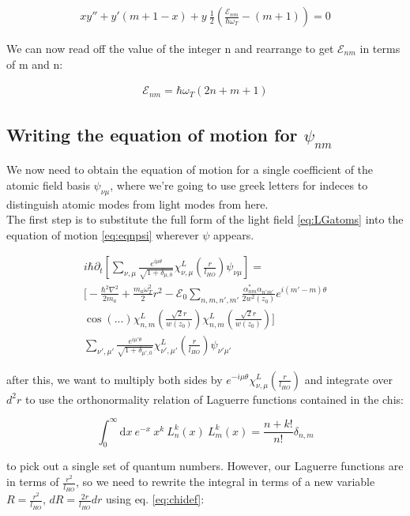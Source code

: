 \documentclass[a4paper,twocolumn,nobalancelastpage]{revtex4-1}
\newcommand{\lho}{l_{HO}}
\newcommand{\wzsq}{w^2(z_0)}
\newcommand{\af}{\psi_{\nu\mu}}
\newcommand{\lf}{\alpha_{nm}}
\newcommand{\lfp}{\alpha_{n'm'}}
\newcommand{\chiaf}{\chi_{\nu,\mu}^L\left(\frac{r}{\lho}\right)}
\newcommand{\chiafp}{\chi_{\nu',\mu'}^L\left(\frac{r}{\lho}\right)}
\newcommand{\chilf}{\chi_{n,m}^L\left(\frac{\sqrt{2}r}{w(z_0)}\right)}
\newcommand{\chilfp}{\chi_{n,m}^L\left(\frac{\sqrt{2}r}{w(z_0)}\right)}
\begin{document}
\begin{align}
xy''+y'(m+1-x)+ y \ \frac{1}{2}\left(\frac{\mathcal{E}_{nm}}{\hbar \omega_{T}} -(m+1)\right)=0 
\end{align}

We can now read off the value of the integer n and rearrange to get $\mathcal{E}_{nm}$ in terms of m and n:

\begin{align}
\label{eq:laguerreterm}
\mathcal{E}_{nm}=\hbar \omega_T (2n+m+1)
\end{align}

\subsection{Writing the equation of motion for $\psi_{nm}$}

We now need to obtain the equation of motion for a single coefficient of the atomic field basis $\af$, where we're going to use greek letters for indeces to distinguish atomic modes from light modes from here.\\

The first step is to substitute the full form of the light field \eqref{eq:LGatoms} into the equation of motion \eqref{eq:eqnpsi} wherever $\psi$ appears.

\begin{multline}
i\hbar \partial_t \left[ \sum_{\nu, \mu} \frac{e^{i \mu \theta}}{\sqrt{1+\delta_{\mu,0}}} \chiaf \psi_{\nu \mu} \right]=\\ \bigg[ -\frac{\hbar^2 \nabla^2}{2m_a}+ \frac{m_a \omega_T^2}{2}r^2 -\mathcal{E}_0 \sum_{n,m,n',m'} \frac{\lf^* \lfp}{2 \wzsq} e^{i(m'-m)\theta} \\ 
\cos(...) \chilf \chilfp \bigg] \\ \sum_{\nu', \mu'} \frac{e^{i \mu' \theta}}{\sqrt{1+\delta_{\mu',0}}} \chiafp \psi_{\nu' \mu'}
\end{multline}

 after this, we want to multiply both sides by $e^{-i \mu \theta} \chiaf$ and integrate over $d^2r$ to use the orthonormality relation of Laguerre functions contained in the chis:

\begin{equation}
\label{eq:LGorthonorm}
\int_0^\infty \mathrm{d}x \ e^{-x} \ x^k \ L^k_n(x) \ L^k_m(x) = \frac{n+k!}{n!} \delta_{n,m}
\end{equation}

to pick out a single set of quantum numbers.
However, our Laguerre functions are in terms of $\frac{r^2}{\lho}$, so we need to rewrite the integral in terms of a new variable $R=\frac{r^2}{\lho}$, $dR=\frac{2r}{\lho}dr$ using eq. \eqref{eq:chidef}:
\end{document}
